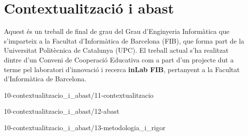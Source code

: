 \chapter{Contextualització i abast}

Aquest és un treball de final de grau del Grau d'Enginyeria Informàtica que s'imparteix a la Facultat d'Informàtica de Barcelona (FIB), que forma part de la Universitat Politècnica de Catalunya (UPC). El treball actual s'ha realitzat dintre d'un Conveni de Cooperació Educativa com a part d'un projecte dut a terme pel laboratori d'innovació i recerca \textbf{inLab FIB}, pertanyent a la Facultat d'Informàtica de Barcelona.

{10-contextualitzacio_i_abast/11-contextualitzacio}

{10-contextualitzacio_i_abast/12-abast}

{10-contextualitzacio_i_abast/13-metodologia_i_rigor}

\begin{comment}
1 Contextualització i abast
1.1 Contextualització 
    1.1.1 Context 
    1.1.2 Problema a resoldre 
    1.1.3 Actors implicats 
    [?] 1.1.4 Justificació
    1.1.5 Lleis i regulacions 
1.2 Abast 
    1.2.1 Objectius 
    1.2.2 Requisits funcionals 
    1.2.3 Requisits no funcionals 
    1.2.4 Obstacles i riscos potencials 
1.3 Metodologia i rigor 
    1.3.1 Metodologia 
    1.3.2 Eines 
\end{comment}